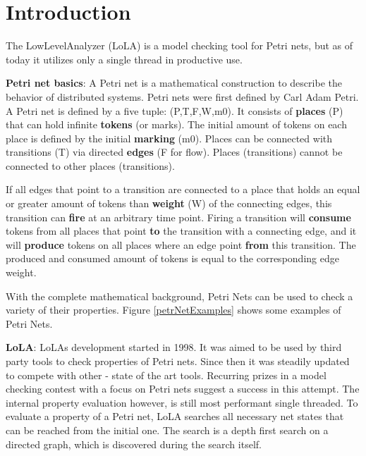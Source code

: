 \chapter{Introduction}
\label{introduction}

The LowLevelAnalyzer (LoLA) is a model checking tool for Petri nets, but as of today it utilizes only a single thread in productive use.

\textbf{Petri net basics}:
A Petri net is a mathematical construction to describe the behavior of distributed systems. Petri nets were first defined by Carl Adam Petri\cite{Petri1962kommunikation}. A Petri net is defined by a five tuple: (P,T,F,W,m0). It consists of \textbf{places} (P) that can hold infinite \textbf{tokens} (or marks). The initial amount of tokens on each place is defined by the initial \textbf{marking} (m0). Places can be connected with transitions (T) via directed \textbf{edges} (F for flow). Places (transitions) cannot be connected to other places (transitions). 

If all edges that point to a transition are connected to a place that holds an equal or greater amount of tokens than \textbf{weight} (W) of the connecting edges, this transition can \textbf{fire} at an arbitrary time point. Firing a transition will \textbf{consume} tokens from all places that point \textbf{to} the transition with a connecting edge, and it will \textbf{produce} tokens on all places where an edge point \textbf{from} this transition. The produced and consumed amount of tokens is equal to the corresponding edge weight.

With the complete mathematical background, Petri Nets can be used to check a variety of their properties. Figure \ref{petrNetExamples} shows some examples of Petri Nets.



\textbf{LoLA}:
LoLAs development started in 1998. It was aimed to be used by third party tools to check properties of Petri nets\cite{schmidt2000lola}. Since then it was steadily updated to compete with other - state of the art tools. Recurring prizes in a model checking contest with a focus on Petri nets suggest a success in this attempt\cite{MCC2017}.
The internal property evaluation however, is still most performant single threaded. To evaluate a property of a Petri net, LoLA searches all necessary net states that can be reached from the initial one. The search is a depth first search on a directed graph, which is discovered during the search itself.

